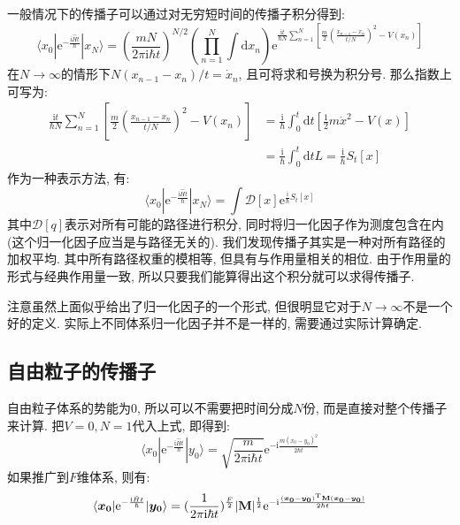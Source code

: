         \splitline

        一般情况下的传播子可以通过对无穷短时间的传播子积分得到:
        \begin{equation}
            \langle x_0 | \mathrm{e}^{-\frac {\mathrm{i}\hat{H}t}{\hbar}} | x_N \rangle = \left(\frac{mN}{2\pi\mathrm{i}\hbar t}\right)^{N/2} \left(\prod_{n = 1}^{N}\int 
            \mathrm{d} x_n \right) \mathrm{e}^{ \frac{\mathrm{i}t}{\hbar N} \sum_{n = 1}^{N} \left[ \frac{m}{2} \left(\frac{x_{n-1} - x_n}{t/N}\right)^2 - V(x_n)\right] }
        \end{equation}
        在$N \to \infty$的情形下$N(x_{n-1} - x_n)/t = \dot x_n$, 且可将求和号换为积分号. 那么指数上可写为: 
        \begin{equation}\begin{aligned}
            \frac{\mathrm{i}t}{\hbar N} \sum_{n = 1}^{N} \left[ \frac{m}{2} \left(\frac{x_{n-1} - x_n}{t/N}\right)^2 - V(x_n)\right] &= \frac{\mathrm{i}}{\hbar} \int_0^t \mathrm{d}t \left[ \frac{1}{2} m \dot x^2 - V(x) \right]\\
            &= \frac{\mathrm{i}}{\hbar} \int_0^t \mathrm{d}t L = \frac{\mathrm{i}}{\hbar} S_t[x]
        \end{aligned}\end{equation}
        作为一种表示方法, 有: 
        \begin{equation}\label{eq:8-2-1}
            \langle x_0 | \mathrm{e}^{-\frac {\mathrm{i}\hat{H}t}{\hbar}} | x_N \rangle = \int \mathcal{D}[x] \mathrm{e}^{ \frac{\mathrm{i}}{\hbar} S_t[x] }
        \end{equation}
        其中$\mathcal{D}[q]$表示对所有可能的路径进行积分, 同时将归一化因子作为测度包含在内(这个归一化因子应当是与路径无关的). 我们发现传播子其实是一种对所有路径的加权平均. 其中所有路径权重的模相等, 但具有与作用量相关的相位. 由于作用量的形式与经典作用量一致, 所以只要我们能算得出这个积分就可以求得传播子. 

        注意虽然上面似乎给出了归一化因子的一个形式, 但很明显它对于$N \to \infty$不是一个好的定义. 实际上不同体系归一化因子并不是一样的, 需要通过实际计算确定. 

        \subsection{自由粒子的传播子}

        自由粒子体系的势能为0, 所以可以不需要把时间分成$N$份, 而是直接对整个传播子来计算. 把$V=0,N=1$代入上式, 即得到:
        \begin{equation}\label{eq:8-2-2}
            \langle x_0 | \mathrm{e}^{-\frac {\mathrm{i}\hat{H}t}{\hbar}} | y_0 \rangle = \sqrt{\frac {m}{2\pi\mathrm{i} \hbar t}} \mathrm{e}^{-\mathrm{i}\frac {m(x_0 - y_0)^2}{2\hbar t}}
        \end{equation}
        如果推广到$F$维体系, 则有:
        \begin{equation}
            \langle \bm{x_0} | \mathrm{e}^{-\frac {\mathrm{i}\hat{H}t}{\hbar}} |\bm{y_0} \rangle = (\frac {1}{2\pi\mathrm{i} \hbar t})^{\frac F2} |\mathbf{M}|^{\frac 12} \mathrm{e}^{-\mathrm{i}\frac {(\bm{x_0}-\bm{y_0})^{\mathrm{T}} \mathbf{M} (\bm{x_0}-\bm{y_0})}{2\hbar t}}
        \end{equation}

